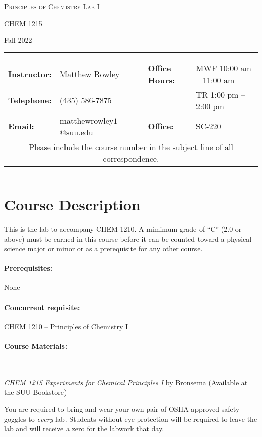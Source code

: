 \documentclass[12pt, letterpaper]{article}
\begin{document}
\begin{center}
	{\Large \textsc{Principles of Chemistry Lab I}}

	CHEM 1215
\end{center}
\begin{center}
	{\large Fall 2022}
\end{center}
\begin{center}
	\rule{0.99\textwidth}{0.4pt}
	\begin{tabular}{llcll}
		\textbf{Instructor:} & Matthew Rowley           &  & \textbf{Office Hours:} & MWF 10:00 am -- 11:00 am \\
		\textbf{Telephone:}  & (435) 586-7875           &  &                        & TR 1:00 pm -- 2:00 pm    \\
		\textbf{Email:}      & matthewrowley$1$@suu.edu &  & \textbf{Office:}       & SC-220                   \\
		\multicolumn{5}{c}{Please include the course number in the subject line of all correspondence.}
	\end{tabular}
	\rule{0.99\textwidth}{0.4pt}
\end{center}

\section*{Course Description}
This is the lab to accompany CHEM 1210. A mimimum grade of ``C'' (2.0 or above) must be earned in this course before it can be counted toward a physical science major or minor or as a prerequisite for any other course.

\paragraph{Prerequisites:}
None

\paragraph{Concurrent requisite:}
CHEM 1210 -- Principles of Chemistry I

\paragraph{Course Materials:} ~

\emph{CHEM 1215 Experiments for Chemical Principles I} by Bronsema (Available at the SUU Bookstore)

You are required to bring and wear your own pair of OSHA-approved safety goggles to \emph{every} lab. Students without eye protection will be required to leave the lab and will receive a zero for the labwork that day.
\end{document}
